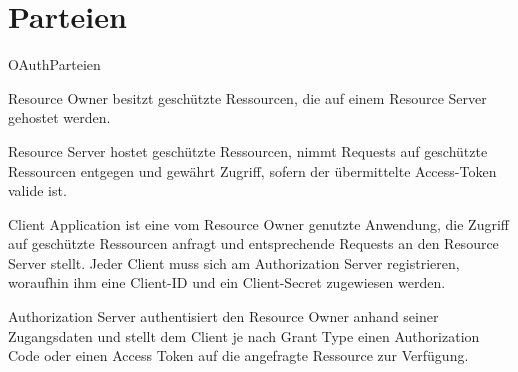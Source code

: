 \section{Parteien}\label{Parteien}
\begin{labeling}{OAuthParteien}
    \item [Resource Owner] besitzt geschützte Ressourcen, die auf einem Resource
    Server gehostet werden.
    \item [Resource Server] hostet geschützte Ressourcen, nimmt Requests auf
    geschützte Ressourcen entgegen und gewährt Zugriff, sofern der übermittelte
    Access-Token valide ist.
    \item [Client Application] ist eine vom Resource Owner genutzte Anwendung,
    die Zugriff auf geschützte Ressourcen anfragt und entsprechende Requests an
    den Resource Server stellt. Jeder Client muss sich am Authorization Server
    registrieren, woraufhin ihm eine Client-ID und ein Client-Secret zugewiesen
    werden.
    \item[Authorization Server] authentisiert den Resource Owner anhand seiner
    Zugangsdaten und stellt dem Client je nach \gls{Grant Type} einen
    Authorization Code oder einen Access Token auf die angefragte Ressource zur
    Verfügung.
\end{labeling}
